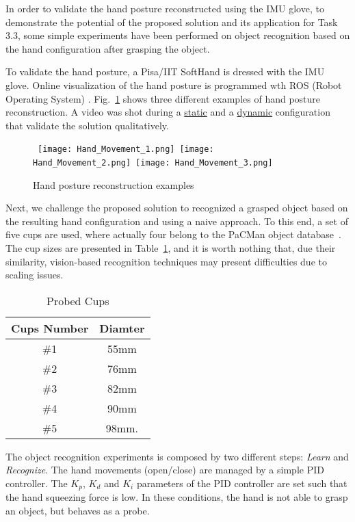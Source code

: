 In order to validate the hand posture reconstructed using the IMU glove, to demonstrate the potential of the proposed solution and its application for Task 3.3, some simple experiments have been performed on object recognition based on the hand configuration after grasping the object.

To validate the hand posture, a Pisa/IIT SoftHand is dressed with the IMU glove. Online visualization of the hand posture is programmed wth ROS (Robot Operating System) \cite{Ros_homepage}. Fig.~\ref{fig:hand_reconstruction_1} shows three different examples of hand posture reconstruction. A video was shot during a \href{https://www.youtube.com/watch?v=0oVha0Q1vWM}{static} and a \href{https://www.youtube.com/watch?v=bceOXa990-Q}{dynamic} configuration that validate the solution qualitatively.

\begin{figure}[h]
\centering
\mbox{
\texttt{[image: Hand\_Movement\_1.png]}
\texttt{[image: Hand\_Movement\_2.png]}
\texttt{[image: Hand\_Movement\_3.png]}
}
\caption{Hand posture reconstruction examples}
\label{fig:hand_reconstruction_1}
\end{figure}


Next, we challenge the proposed solution to recognized a grasped object based on the resulting hand configuration and using a naive approach. To this end, a set of five cups are used, where actually four belong to the PaCMan object database~\cite{PACMAN_datasets}. The cup sizes are presented in Table~\ref{tab:cups}, and it is worth nothing that, due their similarity, vision-based recognition techniques may present difficulties due to scaling issues.

\begin{table}[b]\footnotesize
\begin{tabular}{cc} \hline \hline
Cups Number & Diamter \\ \hline
\#1 & 55mm \\
\#2 & 76mm \\
\#3 & 82mm \\
\#4 & 90mm \\
\#5 & 98mm.
\end{tabular}
\caption{Probed Cups}
\label{tab:cups}
\end{table}

The object recognition experiments is composed by two different steps: \textit{Learn} and \textit{Recognize}.
The hand movements (open/close) are managed by a simple PID controller. The $K_p$, $K_d$ and $K_i$ parameters of the PID controller are set such that the hand squeezing force is low. In these conditions, the hand is not able to grasp an object, but behaves as a probe.

